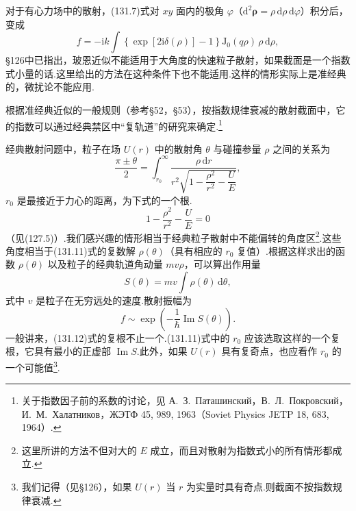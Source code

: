对于有心力场中的散射，(131.7)式对 $xy$ 面内的极角 $\varphi$（$\mathrm{d}^2\boldsymbol{\rho}=\rho\,\mathrm{d}\rho\,\mathrm{d}\varphi$）积分后，变成
\begin{equation}
  f=-\mathrm{i}k\int\left\{\exp[2\mathrm{i}\delta(\rho)]-1\right\}
  \mathrm{J}_0(q\rho)\,\rho\,\mathrm{d}\rho,
\end{equation}
§126中已指出，玻恩近似不能适用于大角度的快速粒子散射，如果截面是一个指数式小量的话.这里给出的方法在这种条件下也不能适用.这样的情形实际上是准经典的，微扰论不能应用.

根据准经典近似的一般规则（参考§52，§53），按指数规律衰减的散射截面中，它的指数可以通过经典禁区中“复轨道”的研究来确定.\footnote{关于指数因子前的系数的讨论，见 А.~З.~Паташинский，В.~Л.~Покровский，И.~М.~Халатников，ЖЭТФ 45, 989, 1963（Soviet Physics JETP 18, 683, 1964）.}

经典散射问题中，粒子在场 $U(r)$ 中的散射角 $\theta$ 与碰撞参量 $\rho$ 之间的关系为
\begin{equation}
  \frac{\pi\pm\theta}{2}=\int_{r_0}^{\infty}
  \frac{\rho\,\mathrm{d}r}
  {r^2\sqrt{1-\dfrac{\rho^2}{r^2}-\dfrac{U}{E}}},
\end{equation}
$r_0$ 是最接近于力心的距离，为下式的一个根.
\begin{equation}
  1-\frac{\rho^2}{r^2}-\frac{U}{E}=0
\end{equation}
（见(127.5)）.我们感兴趣的情形相当于经典粒子散射中不能偏转的角度区\footnote{这里所讲的方法不但对大的 $E$ 成立，而且对散射为指数式小的所有情形都成立.}.这些角度相当于(131.11)式的复数解 $\rho(\theta)$（具有相应的 $r_0$ 复值）.根据这样求出的函数 $\rho(\theta)$ 以及粒子的经典轨道角动量 $mv\rho$，可以算出作用量
\begin{equation}
  S(\theta)=mv\int\rho(\theta)\,\mathrm{d}\theta,
\end{equation}
式中 $v$ 是粒子在无穷远处的速度.散射振幅为
\begin{equation}
  f\sim\exp\left(-\frac{1}{\hbar}\operatorname{Im}S(\theta)\right).
\end{equation}
一般讲来，(131.12)式的复根不止一个.(131.11)式中的 $r_0$ 应该选取这样的一个复根，它具有最小的正虚部 $\operatorname{Im}S$.此外，如果 $U(r)$ 具有复奇点，也应看作 $r_0$ 的一个可能值\footnote{我们记得（见§126），如果 $U(r)$ 当 $r$ 为实量时具有奇点.则截面不按指数规律衰减.}.

